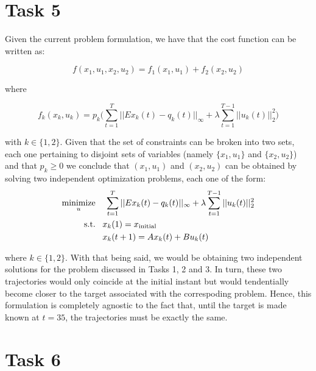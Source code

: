 \documentclass[12pt]{article}
\DeclareMathOperator*{\minimize}{minimize}
\begin{document}
\section{Task 5}

Given the current problem formulation, we have that the cost function can be written as:

\[
    f(x_1, u_1, x_2, u_2) = f_1(x_1, u_1) + f_2(x_2, u_2)
\]

where

\[
    f_k(x_k, u_k) = p_k \bigg( \sum_{t=1}^{T} ||Ex_k(t) - q_k(t)||_{\infty} +
    \lambda \sum_{t=1}^{T-1} ||u_k(t)||_{2}^2 \bigg)
\]

with $k \in \{1, 2\}$. Given that the set of constraints can be broken into two sets, each one pertaining to disjoint sets of variables (namely $\{x_1, u_1\}$ and $\{x_2, u_2\}$) and that $p_k \ge 0$ we conclude that $(x_1, u_1)$ and $(x_2, u_2)$ can be obtained by solving two independent optimization problems, each one of the form:
\vspace{-0.5em}
\begin{align*}
    \minimize_{u}& \hspace*{0.4cm} \sum_{t=1}^{T} ||Ex_k(t) - q_k(t)||_{\infty} +
    \lambda \sum_{t=1}^{T-1} ||u_k(t)||_{2}^2 \\
    \text{s.t.}& \;\;\; x_k(1) = x_{\text{initial}} \\ 
    & \;\;\; x_k(t + 1) = Ax_k(t) + Bu_k(t)
\end{align*}

where $k \in \{1, 2\}$. With that being said, we would be obtaining two independent solutions for the problem discussed in Tasks 1, 2 and 3. In turn, these two trajectories would only coincide at the initial instant but would tendentially become closer to the target associated with the correspoding problem. Hence, this formulation is completely agnostic to the fact that, until the target is made known at $t = 35$, the trajectories must be exactly the same.


\section{Task 6}
\end{document}
